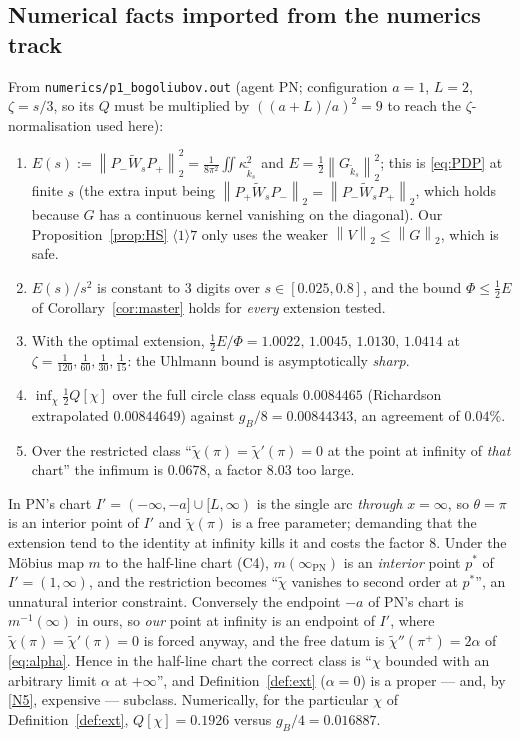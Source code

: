 \documentclass[11pt]{article}
\newcommand{\Pp}{P_+}\newcommand{\Pm}{P_-}
\newcommand{\Wt}{\widetilde W}\newcommand{\kt}{\widetilde k}
\newcommand{\norm}[1]{\left\lVert #1\right\rVert}\newcommand{\abs}[1]{\left|#1\right|}
\begin{document}
\subsection{Numerical facts imported from the numerics track}\label{sec:numerics}
From \texttt{numerics/p1\_bogoliubov.out} (agent PN; configuration $a=1$, $L=2$, $\zeta=s/3$, so its
$Q$ must be multiplied by $((a+L)/a)^2=9$ to reach the $\zeta$-normalisation used here):
\begin{enumerate}[label=(N\arabic*),leftmargin=3em]
\item $E(s):=\norm{\Pm\Wt_s\Pp}_2^2=\frac1{8\pi^2}\iint\kappa_{\kt_s}^2$ and
 $E=\frac12\norm{G_{\kt_s}}_2^2$; this is \eqref{eq:PDP} at finite $s$ (the extra input being
 $\norm{\Pp\Wt_s\Pm}_2=\norm{\Pm\Wt_s\Pp}_2$, which holds because $G$ has a continuous kernel
 vanishing on the diagonal).  Our Proposition~\ref{prop:HS} $\langle1\rangle7$ only uses the weaker
 $\norm{V}_2\le\norm G_2$, which is safe.\label{N1}
\item $E(s)/s^2$ is constant to $3$ digits over $s\in[0.025,0.8]$, and the bound
 $\Phi\le\frac12E$ of Corollary~\ref{cor:master} holds for \emph{every} extension tested.\label{N2}
\item With the optimal extension, $\frac12E/\Phi=1.0022,\,1.0045,\,1.0130,\,1.0414$ at
 $\zeta=\frac1{120},\frac1{60},\frac1{30},\frac1{15}$: the Uhlmann bound is asymptotically
 \emph{sharp}.\label{N3}
\item $\inf_{\chi}\frac12Q[\chi]$ over the full circle class equals $0.0084465$ (Richardson
 extrapolated $0.00844649$) against $g_B/8=0.00844343$, an agreement of $0.04\%$.\label{N4}
\item Over the restricted class ``$\widetilde\chi(\pi)=\widetilde\chi'(\pi)=0$ at the point at
 infinity of \emph{that} chart'' the infimum is $0.0678$, a factor $8.03$ too large.\label{N5}
\end{enumerate}

\begin{remark}\label{rem:factor8}
In PN's chart $I'=(-\infty,-a]\cup[L,\infty)$ is the single arc \emph{through} $x=\infty$, so
$\theta=\pi$ is an interior point of $I'$ and $\widetilde\chi(\pi)$ is a free parameter; demanding
that the extension tend to the identity at infinity kills it and costs the factor $8$.  Under the
M\"obius map $m$ to the half-line chart (C4), $m(\infty_{\mathrm{PN}})$ is an \emph{interior} point
$p^*$ of $I'=(1,\infty)$, and the restriction becomes ``$\widetilde\chi$ vanishes to second order at
$p^*$'', an unnatural interior constraint.  Conversely the endpoint $-a$ of PN's chart is
$m^{-1}(\infty)$ in ours, so \emph{our} point at infinity is an endpoint of $I'$, where
$\widetilde\chi(\pi)=\widetilde\chi'(\pi)=0$ is forced anyway, and the free datum is
$\widetilde\chi''(\pi^+)=2\alpha$ of \eqref{eq:alpha}.  Hence in the half-line chart the correct
class is ``$\chi$ bounded with an arbitrary limit $\alpha$ at $+\infty$'', and
Definition~\ref{def:ext} ($\alpha=0$) is a proper --- and, by \ref{N5}, expensive --- subclass.
Numerically, for the particular $\chi$ of Definition~\ref{def:ext},
$Q[\chi]=0.1926$ versus $g_B/4=0.016887$.
\end{remark}
\end{document}
